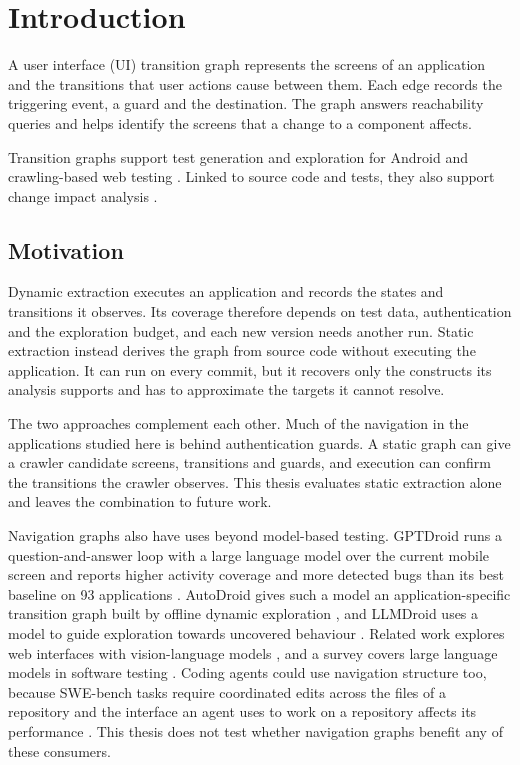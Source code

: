 \section{Introduction}
\label{ch:introduction}

A user interface (UI) transition graph represents the screens of an application and the
transitions that user actions cause between them. Each edge records the triggering event, a guard
and the destination. The graph answers reachability queries and helps identify the screens that a
change to a component affects.

Transition graphs support test generation and exploration for Android
\cite{yang2015wtg,goalexplorer2019,storydroid2019} and crawling-based web testing
\cite{crawljax2012,feedex2013}. Linked to source code and tests, they also support change impact
analysis \cite{arnold1993impact,bohner1996software}.

\subsection{Motivation}

Dynamic extraction executes an application and records the states and transitions it observes.
Its coverage therefore depends on test data, authentication and the exploration budget, and each
new version needs another run. Static extraction instead derives the graph from source code without
executing the application. It can run on every commit, but it recovers only the constructs its
analysis supports and has to approximate the targets it cannot resolve.

The two approaches complement each other. Much of the navigation in the applications studied here
is behind authentication guards. A static graph can give a crawler candidate screens, transitions
and guards, and execution can confirm the transitions the crawler observes. This thesis evaluates
static extraction alone and leaves the combination to future work.

Navigation graphs also have uses beyond model-based testing. GPTDroid runs a question-and-answer
loop with a large language model over the current mobile screen and reports higher activity
coverage and more detected bugs than its best baseline on 93 applications \cite{liu2024make}.
AutoDroid gives such a model an application-specific transition graph built by offline dynamic
exploration \cite{wen2024autodroid}, and LLMDroid uses a model to guide exploration towards
uncovered behaviour \cite{llmdroid2025}. Related work explores web interfaces with vision-language
models \cite{wang2024leveraging}, and a survey covers large language models in software testing
\cite{wang2024software}. Coding agents could use navigation structure too, because SWE-bench tasks
require coordinated edits across the files of a repository \cite{jimenez2024swebench} and the
interface an agent uses to work on a repository affects its performance \cite{yang2024sweagent}. This thesis does not test whether navigation graphs benefit any of these
consumers.

